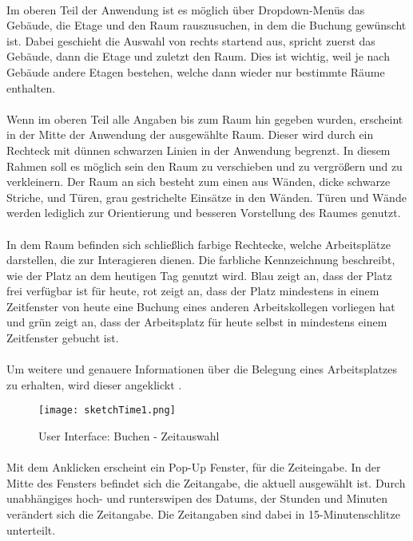 \paragraph{}Im oberen Teil der Anwendung ist es möglich über Dropdown-Menüs das Gebäude, die Etage und den Raum rauszusuchen, in dem die Buchung gewünscht ist.
Dabei geschieht die Auswahl von rechts startend aus, spricht zuerst das Gebäude, dann die Etage und zuletzt den Raum.
Dies ist wichtig, weil je nach Gebäude andere Etagen bestehen, welche dann wieder nur bestimmte Räume enthalten.

\paragraph{}Wenn im oberen Teil alle Angaben bis zum Raum hin gegeben wurden, erscheint in der Mitte der Anwendung der ausgewählte Raum.
Dieser wird durch ein Rechteck mit dünnen  schwarzen Linien in der Anwendung begrenzt.
In diesem Rahmen soll es möglich sein den Raum zu verschieben und zu vergrößern und zu verkleinern.
Der Raum an sich besteht zum einen aus Wänden, dicke schwarze Striche, und Türen, grau gestrichelte Einsätze in den Wänden. Türen und Wände werden 
lediglich zur Orientierung und besseren Vorstellung des Raumes genutzt. 
\paragraph{}In dem Raum befinden sich schließlich farbige Rechtecke, welche Arbeitsplätze darstellen, die zur Interagieren dienen. Die farbliche Kennzeichnung beschreibt, wie der Platz an dem heutigen Tag genutzt wird.
Blau zeigt an, dass der Platz frei verfügbar ist für heute, rot zeigt an, dass der Platz mindestens in einem Zeitfenster von heute eine Buchung eines anderen Arbeitskollegen vorliegen hat und grün zeigt an, dass der Arbeitsplatz für heute selbst in mindestens einem Zeitfenster gebucht ist.
\paragraph{}Um weitere und genauere Informationen über die Belegung eines Arbeitsplatzes zu erhalten, wird dieser angeklickt .

\begin{wrapfigure}[21]{l}{5.5cm}
  \texttt{[image: sketchTime1.png]}
  \caption{User Interface: Buchen - Zeitauswahl}
\end{wrapfigure}

\paragraph{}Mit dem Anklicken erscheint ein Pop-Up Fenster, für die Zeiteingabe. 
In der Mitte des Fensters befindet sich die Zeitangabe, die aktuell ausgewählt ist. 
Durch unabhängiges hoch- und runterswipen des Datums, der Stunden und Minuten verändert sich die Zeitangabe.
Die Zeitangaben sind dabei in 15-Minutenschlitze unterteilt.

